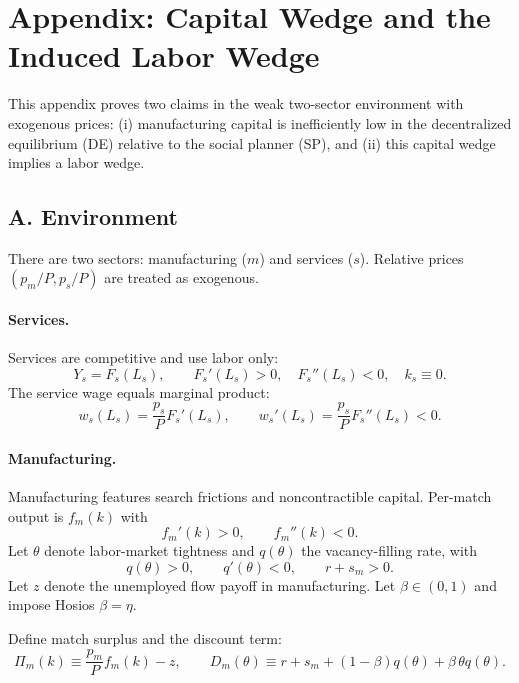 \documentclass[12pt]{article}
\begin{document}
\section*{Appendix: Capital Wedge and the Induced Labor Wedge}

This appendix proves two claims in the weak two-sector environment with exogenous prices:
(i) manufacturing capital is inefficiently low in the decentralized equilibrium (DE) relative to the social planner (SP), and
(ii) this capital wedge implies a labor wedge.


\subsection*{A. Environment}

There are two sectors: manufacturing ($m$) and services ($s$). Relative prices $(p_m/P,p_s/P)$ are treated as exogenous.

\paragraph{Services.}
Services are competitive and use labor only:
\[
Y_s = F_s(L_s), \qquad F_s'(L_s)>0,\quad F_s''(L_s)<0, \quad k_s\equiv 0.
\]
The service wage equals marginal product:
\begin{equation}\label{eq:ws}
w_s(L_s)=\frac{p_s}{P}F_s'(L_s),\qquad w_s'(L_s)=\frac{p_s}{P}F_s''(L_s)<0.
\end{equation}

\paragraph{Manufacturing.}
Manufacturing features search frictions and noncontractible capital. Per-match output is $f_m(k)$ with
\[
f_m'(k)>0,\qquad f_m''(k)<0.
\]
Let $\theta$ denote labor-market tightness and $q(\theta)$ the vacancy-filling rate, with
\[
q(\theta)>0,\qquad q'(\theta)<0,\qquad r+s_m>0.
\]
Let $z$ denote the unemployed flow payoff in manufacturing. Let $\beta\in(0,1)$ and impose Hosios $\beta=\eta$.

Define match surplus and the discount term:
\begin{equation}\label{eq:PiD}
\Pi_m(k)\equiv \frac{p_m}{P}f_m(k)-z,\qquad
D_m(\theta)\equiv r+s_m+(1-\beta)q(\theta)+\beta\,\theta q(\theta).
\end{equation}
\end{document}
